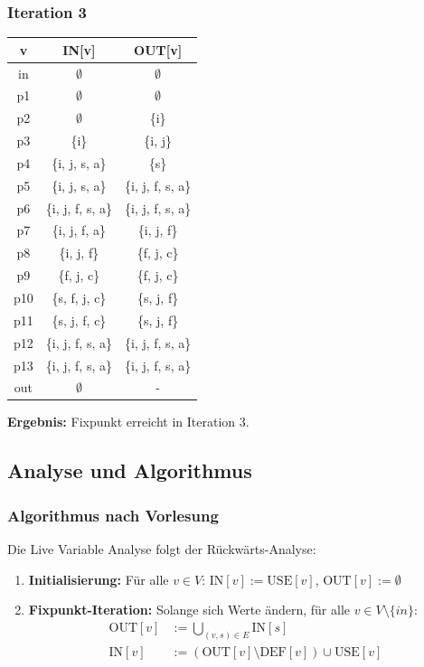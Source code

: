 \documentclass[11pt,a4paper]{article}
\begin{document}
\subsubsection*{Iteration 3}

    \begin{longtable}{| c | c | c |}
    \hline
    v & IN[v] & OUT[v] \\
    \hline
    in & $\emptyset$ & $\emptyset$ \\
    \hline
    p1 & $\emptyset$ & $\emptyset$ \\
    \hline
    p2 & $\emptyset$ & \{i\} \\
    \hline
    p3 & \{i\} & \{i, j\} \\
    \hline
    p4 & \{i, j, s, a\} & \{s\} \\
    \hline
    p5 & \{i, j, s, a\} & \{i, j, f, s, a\} \\
    \hline
    p6 & \{i, j, f, s, a\} & \{i, j, f, s, a\} \\
    \hline
    p7 & \{i, j, f, a\} & \{i, j, f\} \\
    \hline
    p8 & \{i, j, f\} & \{f, j, c\} \\
    \hline
    p9 & \{f, j, c\} & \{f, j, c\} \\
    \hline
    p10 & \{s, f, j, c\} & \{s, j, f\} \\
    \hline
    p11 & \{s, j, f, c\} & \{s, j, f\} \\
    \hline
    p12 & \{i, j, f, s, a\} & \{i, j, f, s, a\} \\
    \hline
    p13 & \{i, j, f, s, a\} & \{i, j, f, s, a\} \\
    \hline
    out & $\emptyset$ & - \\
    \hline
\end{longtable}

\textbf{Ergebnis:} Fixpunkt erreicht in Iteration 3.

\subsection*{Analyse und Algorithmus}

\subsubsection*{Algorithmus nach Vorlesung}

Die Live Variable Analyse folgt der Rückwärts-Analyse:

\begin{enumerate}
    \item \textbf{Initialisierung:} Für alle $v \in V$: $\text{IN}[v] := \text{USE}[v]$, $\text{OUT}[v] := \emptyset$
    \item \textbf{Fixpunkt-Iteration:} Solange sich Werte ändern, für alle $v \in V \setminus \{in\}$:
    \begin{align*}
        \text{OUT}[v] &:= \bigcup_{(v,s) \in E} \text{IN}[s] \\
        \text{IN}[v] &:= (\text{OUT}[v] \setminus \text{DEF}[v]) \cup \text{USE}[v]
    \end{align*}
\end{enumerate}
\end{document}
